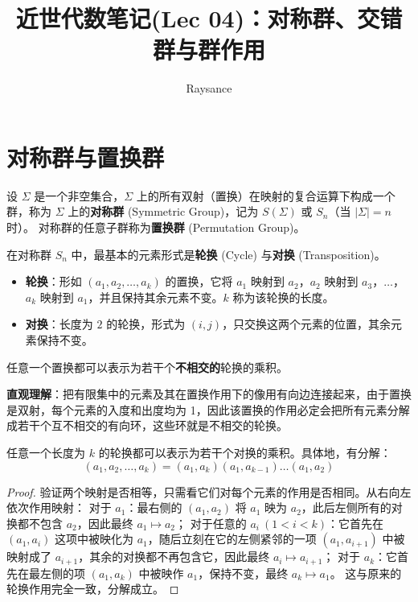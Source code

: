 \documentclass[11pt]{article}
\title{近世代数笔记(Lec 04)：对称群、交错群与群作用}
\author{Raysance}
\date{}
\begin{document}
\maketitle

\section{对称群与置换群}

\begin{cndefinition}[对称群与置换群]
    设 $\Sigma$ 是一个非空集合，$\Sigma$ 上的所有双射（置换）在映射的复合运算下构成一个群，称为 $\Sigma$ 上的\textbf{对称群} (Symmetric Group)，记为 $S(\Sigma)$ 或 $S_n$（当 $|\Sigma| = n$ 时）。  
    对称群的任意子群称为\textbf{置换群} (Permutation Group)。
\end{cndefinition}

在对称群 $S_n$ 中，最基本的元素形式是\textbf{轮换} (Cycle) 与\textbf{对换} (Transposition)。
\begin{cndefinition}[轮换与对换]
    \begin{itemize}
        \item \textbf{轮换}：形如 $(a_1, a_2, \dots, a_k)$ 的置换，它将 $a_1$ 映射到 $a_2$，$a_2$ 映射到 $a_3$，$\dots$，$a_k$ 映射到 $a_1$，并且保持其余元素不变。$k$ 称为该轮换的长度。
        \item \textbf{对换}：长度为 $2$ 的轮换，形式为 $(i, j)$，只交换这两个元素的位置，其余元素保持不变。
    \end{itemize}
\end{cndefinition}

\begin{cntheorem}[置换的轮换分解]
    任意一个置换都可以表示为若干个\textbf{不相交的}轮换的乘积。
\end{cntheorem}
\textbf{直观理解}：把有限集中的元素及其在置换作用下的像用有向边连接起来，由于置换是双射，每个元素的入度和出度均为 1，因此该置换的作用必定会把所有元素分解成若干个互不相交的有向环，这些环就是不相交的轮换。

\begin{cntheorem}[轮换的对换分解]
    任意一个长度为 $k$ 的轮换都可以表示为若干个对换的乘积。具体地，有分解：
    \[
        (a_1, a_2, \dots, a_k) = (a_1, a_k)(a_1, a_{k-1}) \dots (a_1, a_2)
    \]
\end{cntheorem}
\begin{proof}
    验证两个映射是否相等，只需看它们对每个元素的作用是否相同。从右向左依次作用映射：
    对于 $a_1$：最右侧的 $(a_1,a_2)$ 将 $a_1$ 映为 $a_2$，此后左侧所有的对换都不包含 $a_2$，因此最终 $a_1 \mapsto a_2$；
    对于任意的 $a_i~(1 < i < k)$：它首先在 $(a_1,a_i)$ 这项中被映化为 $a_1$，随后立刻在它的左侧紧邻的一项 $(a_1, a_{i+1})$ 中被映射成了 $a_{i+1}$，其余的对换都不再包含它，因此最终 $a_i \mapsto a_{i+1}$；
    对于 $a_k$：它首先在最左侧的项 $(a_1, a_k)$ 中被映作 $a_1$，保持不变，最终 $a_k \mapsto a_1$。
    这与原来的轮换作用完全一致，分解成立。
\end{proof}
\end{document}
